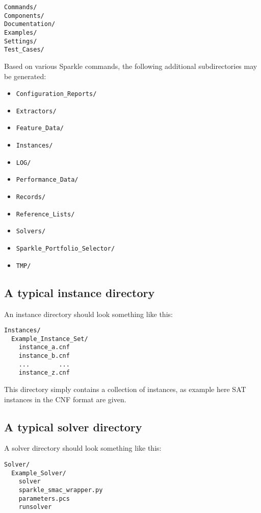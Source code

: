 \documentclass{article}
\begin{document}
\begin{verbatim}
Commands/
Components/
Documentation/
Examples/
Settings/
Test_Cases/
\end{verbatim}

Based on various Sparkle commands, the following additional subdirectories may be generated:

\begin{itemize}[noitemsep]
  \item[] \texttt{Configuration\_Reports/}
  \item[] \texttt{Extractors/}
  \item[] \texttt{Feature\_Data/}
  \item[\ref{dir:instances}] \texttt{Instances/}
  \item[] \texttt{LOG/}
  \item[] \texttt{Performance\_Data/}
  \item[] \texttt{Records/}
  \item[] \texttt{Reference\_Lists/}
  \item[\ref{dir:solvers}] \texttt{Solvers/}
  \item[] \texttt{Sparkle\_Portfolio\_Selector/}
  \item[] \texttt{TMP/}
\end{itemize}

\subsection{A typical instance directory}
\label{dir:instances}

An instance directory should look something like this:

\begin{verbatim}
Instances/
  Example_Instance_Set/
    instance_a.cnf
    instance_b.cnf
    ...        ...
    instance_z.cnf
\end{verbatim}

This directory simply contains a collection of instances, as example here SAT instances in the CNF format are given.

\subsection{A typical solver directory}
\label{dir:solvers}

A solver directory should look something like this:

\begin{verbatim}
Solver/
  Example_Solver/
    solver
    sparkle_smac_wrapper.py
    parameters.pcs
    runsolver
\end{verbatim}
\end{document}
